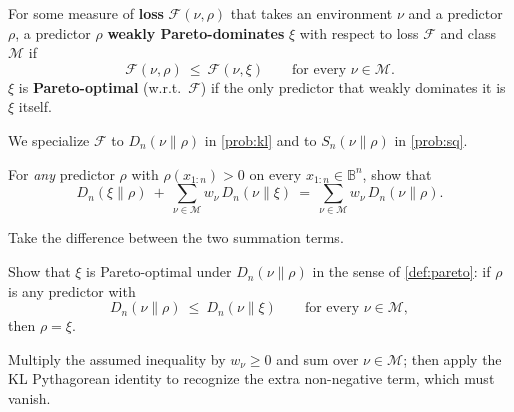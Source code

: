 \documentclass[fontsize=11pt, parskip=half]{scrartcl}
\newcommand{\Mc}{\mathcal{M}}
\newcommand{\Sn}[2]{S_{n}(#1 \parallel #2)}
\begin{document}
\begin{definition}\label{def:pareto}
For some measure of \textbf{loss} $\mathcal F(\nu, \rho)$ that takes an environment $\nu$ and a
predictor $\rho$, a predictor $\rho$ \textbf{weakly Pareto-dominates} $\xi$  with respect to 
loss $\mathcal{F}$ and class $\mathcal{M}$ if
\[
  \mathcal F(\nu, \rho) ~\leq~ \mathcal F(\nu, \xi)
  \qquad \text{for every } \nu \in \Mc.
\]
$\xi$ is \textbf{Pareto-optimal} (w.r.t.\ $\mathcal F$) if the only predictor
that weakly dominates it is $\xi$ itself.

We specialize $\mathcal F$ to $D_n(\nu \parallel \rho)$ in \cref{prob:kl} 
and to $\Sn{\nu}{\rho}$ in \cref{prob:sq}.
\end{definition}


\begin{exercise}
\label{prob:kl_pythag}



For \emph{any} predictor $\rho$ with $\rho(x_{1:n}) > 0$ on every $x_{1:n} \in \mathbb{B}^n$, show that
\[
  D_n(\xi \parallel \rho) ~+~ \sum_{\nu \in \Mc} w_\nu \, D_n(\nu \parallel \xi)
  ~=~ \sum_{\nu \in \Mc} w_\nu \, D_n(\nu \parallel \rho).
\]


\begin{hint}
Take the difference between the two summation terms.
\end{hint}
\end{exercise}


\begin{exercise}
\label{prob:kl_pareto}



Show that $\xi$ is Pareto-optimal under $D_n(\nu \parallel \rho)$ in the sense of \cref{def:pareto}: if $\rho$ is any predictor with
\[
  D_n(\nu \parallel \rho) ~\leq~ D_n(\nu \parallel \xi) \qquad \text{for every } \nu \in \Mc,
\]
then $\rho = \xi$.

\begin{hint}
Multiply the assumed inequality by $w_\nu \geq 0$ and sum over
$\nu \in \Mc$; then apply the KL Pythagorean identity to recognize the extra
non-negative term, which must vanish.
\end{hint}
\end{exercise}
\end{document}
